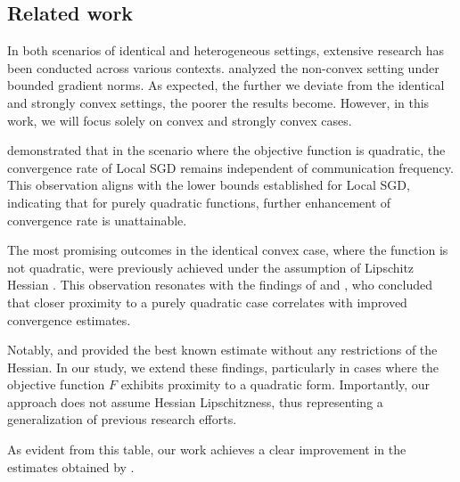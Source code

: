 

\vspace{10pt}

\subsection{Related work}

In both scenarios of identical and heterogeneous settings, extensive research has been conducted across various contexts. \citep{Li} analyzed the non-convex setting under bounded gradient norms. As expected, the further we deviate from the identical and strongly convex settings, the poorer the results become. However, in this work, we will focus solely on convex and strongly convex cases.

\vspace{10pt}

\cite{Woodworth} demonstrated that in the scenario where the objective function is quadratic, the convergence rate of Local SGD remains independent of communication frequency. This observation aligns with the lower bounds established for Local SGD, indicating that for purely quadratic functions, further enhancement of convergence rate is unattainable.

\vspace{10pt}

The most promising outcomes in the identical convex case, where the function is not quadratic, were previously achieved under the assumption of Lipschitz Hessian \citep{FedAC}. This observation resonates with the findings of \cite{FedAC} and \cite{Spiridonoff}, who concluded that closer proximity to a purely quadratic case correlates with improved convergence estimates.

\vspace{10pt}

Notably, \cite{Khaled} and \cite{Woodworth} provided the best known estimate without any restrictions of the Hessian. In our study, we extend these findings, particularly in cases where the objective function $F$ exhibits proximity to a quadratic form. Importantly, our approach does not assume Hessian Lipschitzness, thus representing a generalization of previous research efforts.



As evident from this table, our work achieves a clear improvement in the estimates obtained by \cite{Khaled}.


